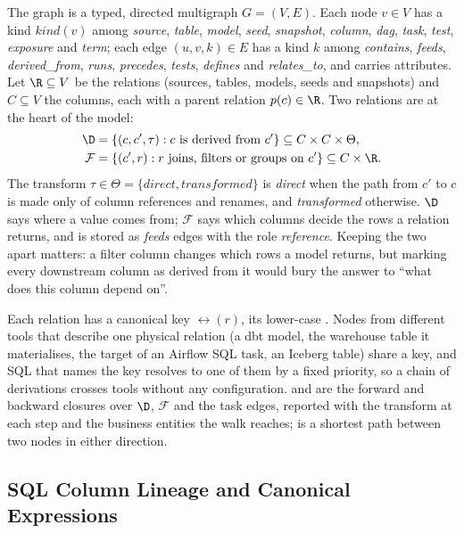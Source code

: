 The graph is a typed, directed multigraph $G = (V, E)$. Each node $v \in V$ has a kind
$\mathit{kind}(v)$ among \emph{source}, \emph{table}, \emph{model}, \emph{seed}, \emph{snapshot},
\emph{column}, \emph{dag}, \emph{task}, \emph{test}, \emph{exposure} and \emph{term}; each edge
$(u, v, k) \in E$ has a kind $k$ among \emph{contains}, \emph{feeds}, \emph{derived\_from},
\emph{runs}, \emph{precedes}, \emph{tests}, \emph{defines} and \emph{relates\_to}, and carries
attributes. Let $\R \subseteq V$ be the relations (sources, tables, models, seeds and snapshots)
and $C \subseteq V$ the columns, each with a parent relation $p(c) \in \R$. Two relations are at
the heart of the model:
\begin{align}
  \D &= \{(c, c', \tau) : c \text{ is derived from } c'\} \subseteq C \times C \times \Theta, \label{eq:lineage}\\
  \mathcal{F} &= \{(c', r) : r \text{ joins, filters or groups on } c'\} \subseteq C \times \R. \label{eq:refs}
\end{align}
The transform $\tau \in \Theta = \{\textit{direct}, \textit{transformed}\}$ is \emph{direct} when the path from $c'$ to $c$ is made only of column
references and renames, and \emph{transformed} otherwise. $\D$ says where a value comes from;
$\mathcal{F}$ says which columns decide the rows a relation returns, and is stored as
\emph{feeds} edges with the role \emph{reference}. Keeping the two apart matters: a filter column
changes which rows a model returns, but marking every downstream column as derived from it would
bury the answer to ``what does this column depend on''.

Each relation has a canonical key $\rel(r)$, its lower-case . Nodes from
different tools that describe one physical relation (a dbt model, the warehouse table it
materialises, the target of an Airflow SQL task, an Iceberg table) share a key, and SQL that names
the key resolves to one of them by a fixed priority, so a chain of derivations crosses tools
without any configuration.  and  are the forward and backward closures
over $\D$, $\mathcal{F}$ and the task edges, reported with the transform at each step and the
business entities the walk reaches;  is a shortest path between two nodes in either
direction.

\subsection{SQL Column Lineage and Canonical Expressions}
\label{sec:sql}

